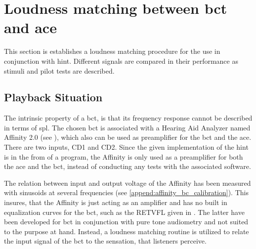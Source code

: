 
\section{Loudness matching between \gls{bct} and \gls{ace}}
\label{sec:loudness_match}
This section is establishes a loudness matching procedure for the use in conjunction with \gls{hint}. Different signals are compared in their performance as stimuli and pilot tests are described.


\subsection{Playback Situation}

The intrinsic property of a \gls{bct}, is that its frequency response cannot be described in terms of \gls{spl}.
The chosen \gls{bct} is associated with a Hearing Aid Analyzer named Affinity 2.0 (see \citep{affinity_20}), which also can be used as preamplifier for the \gls{bct} and the \gls{ace}. There are two inputs, CD1 and CD2. Since the given implementation of the \gls{hint} is in the from of a \matlab program, the Affinity is only used as a preamplifier for both the \gls{ace} and the \gls{bct}, instead of conducting any tests with the associated software.


The relation between input and output voltage of the Affinity has been measured with sinusoids at several frequencies (see \autoref{append:affinity_bc_calibration}).
This insures, that the Affinity is just acting as an amplifier and has no built in equalization curves for the \gls{bct}, such as the RETVFL given in \citep[Tab. 1]{iso_389-3}. The latter have been developed for \gls{bct} in conjunction with pure tone audiometry and not suited to the purpose at hand.
Instead, a loudness matching routine is utilized to relate the input signal of the \gls{bct} to the sensation, that listeners perceive.


